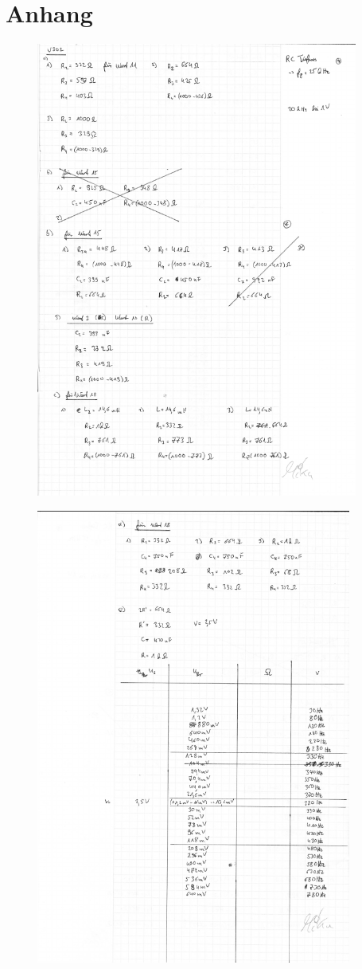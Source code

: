\newpage
\section{Anhang}

\begin{figure}
    \includegraphics[height=15cm]{content/Seite_1.png}
\end{figure}

\begin{figure}
    \includegraphics[height=15cm]{content/Seite_2.png}
    \end{figure}